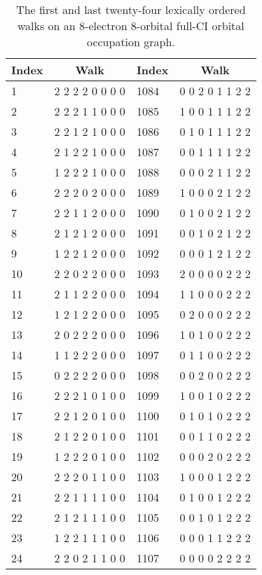 \documentclass[fullpage,12pt,fleqn]{article}
\begin{document}
\begin{table}[htbp]

\center

\begin{tabular}{lc|lc}
  Index  & Walk  & Index & Walk \\ \hline
   1 & 2 2 2 2 0 0 0 0   &1084 & 0 0 2 0 1 1 2 2 \\
   2 & 2 2 2 1 1 0 0 0   &1085 & 1 0 0 1 1 1 2 2 \\
   3 & 2 2 1 2 1 0 0 0   &1086 & 0 1 0 1 1 1 2 2 \\
   4 & 2 1 2 2 1 0 0 0   &1087 & 0 0 1 1 1 1 2 2 \\
   5 & 1 2 2 2 1 0 0 0   &1088 & 0 0 0 2 1 1 2 2 \\
   6 & 2 2 2 0 2 0 0 0   &1089 & 1 0 0 0 2 1 2 2 \\
   7 & 2 2 1 1 2 0 0 0   &1090 & 0 1 0 0 2 1 2 2 \\
   8 & 2 1 2 1 2 0 0 0   &1091 & 0 0 1 0 2 1 2 2 \\
   9 & 1 2 2 1 2 0 0 0   &1092 & 0 0 0 1 2 1 2 2 \\
  10 & 2 2 0 2 2 0 0 0   &1093 & 2 0 0 0 0 2 2 2 \\
  11 & 2 1 1 2 2 0 0 0   &1094 & 1 1 0 0 0 2 2 2 \\
  12 & 1 2 1 2 2 0 0 0   &1095 & 0 2 0 0 0 2 2 2 \\
  13 & 2 0 2 2 2 0 0 0   &1096 & 1 0 1 0 0 2 2 2 \\
  14 & 1 1 2 2 2 0 0 0   &1097 & 0 1 1 0 0 2 2 2 \\
  15 & 0 2 2 2 2 0 0 0   &1098 & 0 0 2 0 0 2 2 2 \\
  16 & 2 2 2 1 0 1 0 0   &1099 & 1 0 0 1 0 2 2 2 \\
  17 & 2 2 1 2 0 1 0 0   &1100 & 0 1 0 1 0 2 2 2 \\
  18 & 2 1 2 2 0 1 0 0   &1101 & 0 0 1 1 0 2 2 2 \\
  19 & 1 2 2 2 0 1 0 0   &1102 & 0 0 0 2 0 2 2 2 \\
  20 & 2 2 2 0 1 1 0 0   &1103 & 1 0 0 0 1 2 2 2 \\
  21 & 2 2 1 1 1 1 0 0   &1104 & 0 1 0 0 1 2 2 2 \\
  22 & 2 1 2 1 1 1 0 0   &1105 & 0 0 1 0 1 2 2 2 \\
  23 & 1 2 2 1 1 1 0 0   &1106 & 0 0 0 1 1 2 2 2 \\
  24 & 2 2 0 2 1 1 0 0   &1107 & 0 0 0 0 2 2 2 2 \\ \hline
\end{tabular}

\caption{\label{owalks} The first and last twenty-four lexically
ordered walks on an 8-electron 8-orbital full-CI orbital occupation graph.}
\end{table}
\end{document}
